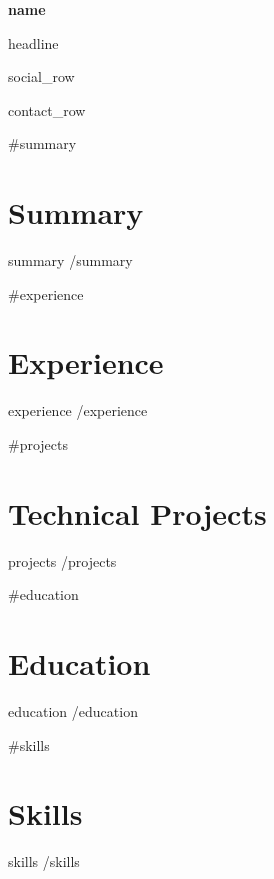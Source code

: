 \documentclass[10pt,letterpaper]{article}
\newcommand{\resumeHeader}[4]{%
  \noindent
  \begin{minipage}[t]{0.54\textwidth}
    {\fontsize{21}{23}\selectfont\bfseries\color{Heading} #1\par}
    \vspace{0.10em}
    {\normalsize\color{Accent} #2\par}
  \end{minipage}\hfill
  \begin{minipage}[t]{0.42\textwidth}
    \raggedleft
    {\footnotesize\color{Body} #3\par}
    \vspace{0.10em}
    {\footnotesize\color{Body} #4\par}
  \end{minipage}
  \vspace{0.10em}
}
\begin{document}
\resumeHeader{{{name}}}{{{headline}}}{{{social_row}}}{{{contact_row}}}

\vspace{0.05em}

{{#summary}}
\section*{Summary}
{\small\color{Body} {{summary}}}
{{/summary}}

{{#experience}}
\section*{Experience}
{\small\color{Body} {{experience}}}
{{/experience}}

{{#projects}}
\section*{Technical Projects}
{{projects}}
{{/projects}}

{{#education}}
\section*{Education}
{\small\color{Body} {{education}}}
{{/education}}

{{#skills}}
\section*{Skills}
{\footnotesize\color{Body} {{skills}}}
{{/skills}}
\end{document}
